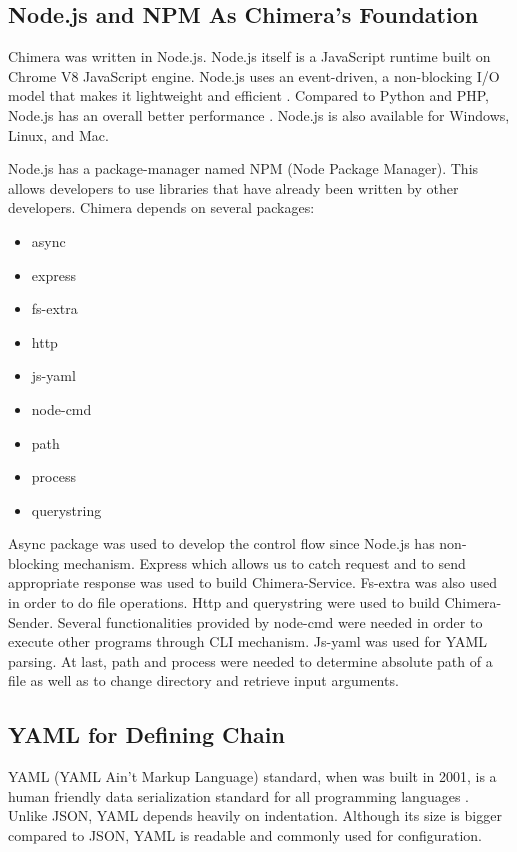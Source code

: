 \documentclass[conference]{IEEEtran}
\begin{document}
\subsection{Node.js and NPM As Chimera's Foundation}

Chimera was written in Node.js. Node.js itself is a JavaScript runtime built on Chrome 
V8 JavaScript engine. Node.js uses an event-driven, a non-blocking I/O model that makes it 
lightweight and efficient \cite{nodejs}. Compared to Python and PHP, Node.js has an 
overall better performance \cite{lei2014performance}. Node.js is also available for
Windows, Linux, and Mac.

Node.js has a package-manager named NPM (Node Package Manager). This allows developers
to use libraries that have already been written by other developers. Chimera depends on 
several packages:

\begin{itemize}
    \item async
    \item express
    \item fs-extra
    \item http
    \item js-yaml
    \item node-cmd
    \item path
    \item process
    \item querystring
\end{itemize}

Async package was used to develop the control flow since Node.js has non-blocking
mechanism. Express which allows us to catch request
and to send appropriate response was used to build Chimera-Service. Fs-extra was also used in order to do file operations.
Http and querystring were used to build Chimera-Sender. Several functionalities
provided by node-cmd were needed in order to execute other programs through CLI mechanism.
Js-yaml was used for YAML parsing. At last, path and process were needed to determine 
absolute path of a file as well as to change directory and retrieve input arguments.

\subsection{YAML for Defining Chain}

YAML (YAML Ain't Markup Language) standard, when was built in 2001, is a human friendly data serialization standard for 
all programming languages \cite{yaml}. Unlike JSON,
YAML depends heavily on indentation. Although its size is bigger compared to JSON, YAML
is readable and commonly used for configuration.
\end{document}
